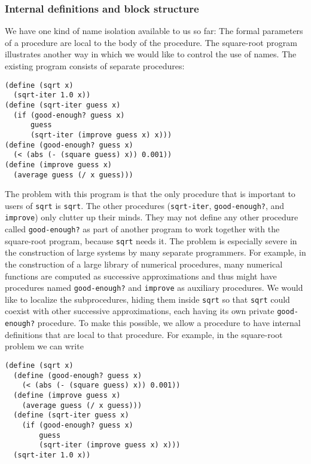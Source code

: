 \subsubsection*{Internal definitions and block structure}


We have one kind of name isolation available to us so far: The formal
parameters of a procedure are local to the body of the procedure.  The
square-root program illustrates another way in which we would like to
control the use of names.  The existing program consists of separate
procedures:

\begin{verbatim}
(define (sqrt x)
  (sqrt-iter 1.0 x))
(define (sqrt-iter guess x)
  (if (good-enough? guess x)
      guess
      (sqrt-iter (improve guess x) x)))
(define (good-enough? guess x)
  (< (abs (- (square guess) x)) 0.001))
(define (improve guess x)
  (average guess (/ x guess)))
\end{verbatim}

The problem with this program is that the only procedure that is
important to users of \texttt{sqrt} is \texttt{sqrt}.  The other
procedures (\texttt{sqrt-iter}, \texttt{good-enough?}, and
\texttt{improve}) only clutter up their minds.  They may not define
any other procedure called \texttt{good-enough?} as part of another
program to work together with the square-root program, because
\texttt{sqrt} needs it.  The problem is especially severe in the
construction of large systems by many separate programmers.  For
example, in the construction of a large library of numerical
procedures, many numerical functions are computed as successive
approximations and thus might have procedures named
\texttt{good-enough?} and \texttt{improve} as auxiliary procedures.
We would like to localize the subprocedures, hiding them inside
\texttt{sqrt} so that \texttt{sqrt} could coexist with other
successive approximations, each having its own private
\texttt{good-enough?} procedure.  To make this possible, we allow a
procedure to have internal definitions that are local to that
procedure.  For example, in the square-root problem we can write

\begin{verbatim}
(define (sqrt x)
  (define (good-enough? guess x)
    (< (abs (- (square guess) x)) 0.001))
  (define (improve guess x)
    (average guess (/ x guess)))
  (define (sqrt-iter guess x)
    (if (good-enough? guess x)
        guess
        (sqrt-iter (improve guess x) x)))
  (sqrt-iter 1.0 x))
\end{verbatim}


